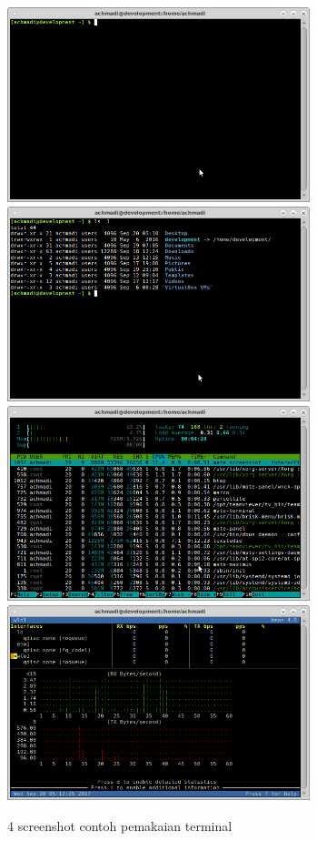 \documentclass[12pt,]{article}
\begin{document}
	\begin{figure}[h]
		\centering
		\includegraphics[width=250pt]{png/term_1}
		\includegraphics[width=250pt]{png/term_2}
		\includegraphics[width=250pt]{png/term_3}
		\includegraphics[width=250pt]{png/term_4}
		\caption{4 screenshot contoh pemakaian terminal}
	\end{figure}
	  
\end{document}
